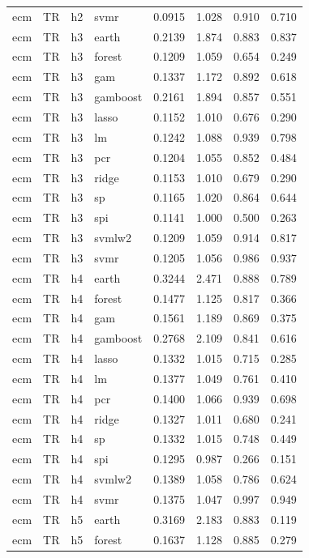 \begin{ThreePartTable}
\begin{longtable}[t]{llclcccc}
ecm & TR & h2 & svmr & 0.0915 & 1.028 & 0.910 & 0.710\\
\addlinespace
ecm & TR & h3 & earth & 0.2139 & 1.874 & 0.883 & 0.837\\
ecm & TR & h3 & forest & 0.1209 & 1.059 & 0.654 & 0.249\\
ecm & TR & h3 & gam & 0.1337 & 1.172 & 0.892 & 0.618\\
ecm & TR & h3 & gamboost & 0.2161 & 1.894 & 0.857 & 0.551\\
ecm & TR & h3 & lasso & 0.1152 & 1.010 & 0.676 & 0.290\\
ecm & TR & h3 & lm & 0.1242 & 1.088 & 0.939 & 0.798\\
ecm & TR & h3 & pcr & 0.1204 & 1.055 & 0.852 & 0.484\\
ecm & TR & h3 & ridge & 0.1153 & 1.010 & 0.679 & 0.290\\
ecm & TR & h3 & sp & 0.1165 & 1.020 & 0.864 & 0.644\\
ecm & TR & h3 & spi & 0.1141 & 1.000 & 0.500 & 0.263\\
ecm & TR & h3 & svmlw2 & 0.1209 & 1.059 & 0.914 & 0.817\\
ecm & TR & h3 & svmr & 0.1205 & 1.056 & 0.986 & 0.937\\
\addlinespace
ecm & TR & h4 & earth & 0.3244 & 2.471 & 0.888 & 0.789\\
ecm & TR & h4 & forest & 0.1477 & 1.125 & 0.817 & 0.366\\
ecm & TR & h4 & gam & 0.1561 & 1.189 & 0.869 & 0.375\\
ecm & TR & h4 & gamboost & 0.2768 & 2.109 & 0.841 & 0.616\\
ecm & TR & h4 & lasso & 0.1332 & 1.015 & 0.715 & 0.285\\
ecm & TR & h4 & lm & 0.1377 & 1.049 & 0.761 & 0.410\\
ecm & TR & h4 & pcr & 0.1400 & 1.066 & 0.939 & 0.698\\
ecm & TR & h4 & ridge & 0.1327 & 1.011 & 0.680 & 0.241\\
ecm & TR & h4 & sp & 0.1332 & 1.015 & 0.748 & 0.449\\
ecm & TR & h4 & spi & 0.1295 & 0.987 & 0.266 & 0.151\\
ecm & TR & h4 & svmlw2 & 0.1389 & 1.058 & 0.786 & 0.624\\
ecm & TR & h4 & svmr & 0.1375 & 1.047 & 0.997 & 0.949\\
\addlinespace
ecm & TR & h5 & earth & 0.3169 & 2.183 & 0.883 & 0.119\\
ecm & TR & h5 & forest & 0.1637 & 1.128 & 0.885 & 0.279\\

\end{longtable}
\end{ThreePartTable}

